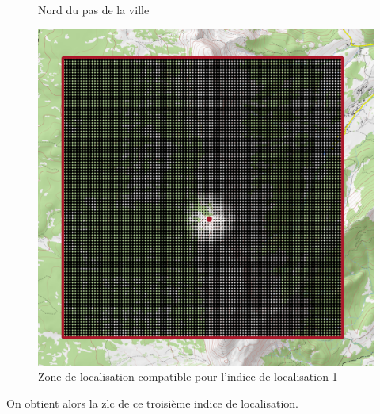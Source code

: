 \begin{figure}
  \centering
  
  \caption{Nord du pas de la ville}
  \label{fig:ZLC_Nord_Pas_Ville}
\end{figure}


\begin{figure}
  \centering
  \includegraphics{../figures/Exterieur_PasVille_GrandVeymont.png}
  \caption{Zone de localisation compatible pour l'indice de
    localisation 1}
\end{figure}


On obtient alors la \ac{zlc} de ce troisième indice de localisation.

